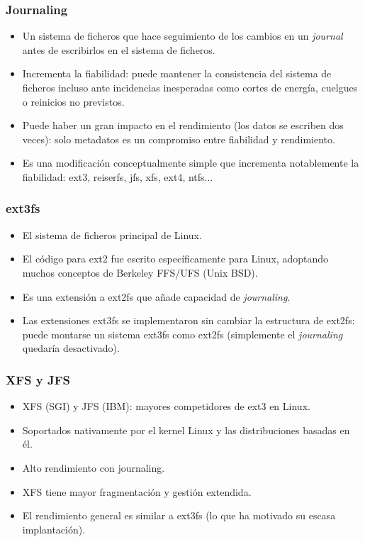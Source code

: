 \documentclass{beamer}
\begin{document}
\begin{frame}
  \frametitle{Journaling}
  \begin{itemize}
    \item Un sistema de ficheros que hace seguimiento de los cambios en un \textit{journal} antes de escribirlos en el sistema de ficheros.
    \item Incrementa la fiabilidad: puede mantener la consistencia del sistema de ficheros incluso ante incidencias inesperadas como cortes de energía, cuelgues o reinicios no previstos.
    \item Puede haber un gran impacto en el rendimiento (los datos se escriben dos veces): solo metadatos es un compromiso entre fiabilidad y rendimiento.
    \item Es una modificación conceptualmente simple que incrementa notablemente la fiabilidad: ext3, reiserfs, jfs, xfs, ext4, ntfs... 
  \end{itemize}
\end{frame}


\begin{frame}
  \frametitle{ext3fs}
  \begin{itemize}
    \item El sistema de ficheros principal de Linux.
    \item El código para ext2 fue escrito específicamente para Linux, adoptando muchos conceptos de Berkeley FFS/UFS (Unix BSD).
    \item Es una extensión a ext2fs que añade capacidad de \textit{journaling}.
    \item Las extensiones ext3fs se implementaron sin cambiar la estructura de ext2fs: puede montarse un sistema ext3fs como ext2fs (simplemente el \textit{journaling} quedaría desactivado).
  \end{itemize}
\end{frame}


\begin{frame}
  \frametitle{XFS y JFS}
  \begin{itemize}
    \item XFS (SGI) y JFS (IBM): mayores competidores de ext3 en Linux.
    \item Soportados nativamente por el kernel Linux y las distribuciones basadas en él.
    \item Alto rendimiento con journaling.
    \item XFS tiene mayor fragmentación y gestión extendida.
    \item El rendimiento general es similar a ext3fs (lo que ha motivado su escasa implantación).
  \end{itemize}
\end{frame}
\end{document}
